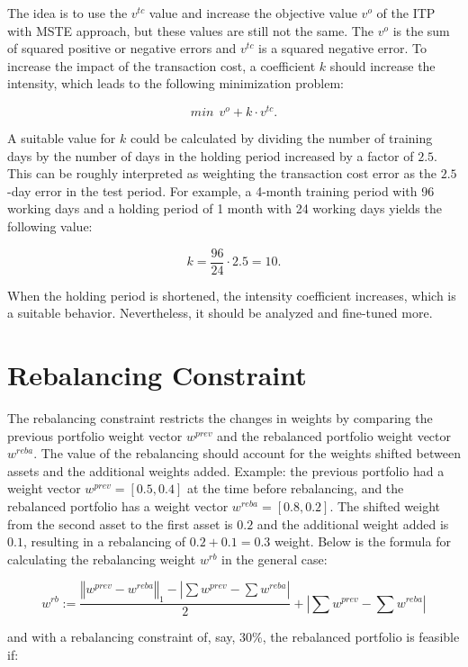 \documentclass[
  oneside, a4paper, 12pt, openany]{book}
\theoremstyle{definition}
\theoremstyle{definition}
\theoremstyle{definition}
\theoremstyle{definition}
\theoremstyle{remark}
\begin{document}
The idea is to use the \(v^{tc}\) value and increase the objective value \(v^o\) of the ITP with MSTE approach, but these values are still not the same. The \(v^o\) is the sum of squared positive or negative errors and \(v^{tc}\) is a squared negative error. To increase the impact of the transaction cost, a coefficient \(k\) should increase the intensity, which leads to the following minimization problem:

\[
  min \ \  v^o + k \cdot v^{tc}.
\]

A suitable value for \(k\) could be calculated by dividing the number of training days by the number of days in the holding period increased by a factor of \(2.5\). This can be roughly interpreted as weighting the transaction cost error as the \(2.5\)-day error in the test period. For example, a 4-month training period with 96 working days and a holding period of 1 month with 24 working days yields the following value:

\[
  k = \frac{96}{24} \cdot 2.5 = 10.
\]

When the holding period is shortened, the intensity coefficient increases, which is a suitable behavior. Nevertheless, it should be analyzed and fine-tuned more.

\hypertarget{rebalancing-constraint}{%
\section{Rebalancing Constraint}\label{rebalancing-constraint}}

The rebalancing constraint restricts the changes in weights by comparing the previous portfolio weight vector \(w^{prev}\) and the rebalanced portfolio weight vector \(w^{reba}\). The value of the rebalancing should account for the weights shifted between assets and the additional weights added. Example: the previous portfolio had a weight vector \(w^{prev} = [0.5, 0.4]\) at the time before rebalancing, and the rebalanced portfolio has a weight vector \(w^{reba} = [0.8, 0.2]\). The shifted weight from the second asset to the first asset is \(0.2\) and the additional weight added is \(0.1\), resulting in a rebalancing of \(0.2+0.1=0.3\) weight. Below is the formula for calculating the rebalancing weight \(w^{rb}\) in the general case:

\[
  w^{rb} := \frac{\left\Vert w^{prev}-w^{reba} \right\Vert_1 - |\sum w^{prev} - \sum w^{reba}|}{2}+|\sum w^{prev} - \sum w^{reba}|
\]

and with a rebalancing constraint of, say, 30\%, the rebalanced portfolio is feasible if:
\end{document}
